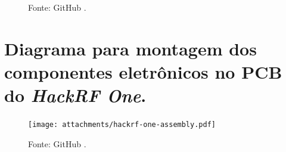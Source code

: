 \documentclass[
  12pt,				%
  openright,			%
  twoside,			%
  a4paper,			%
  english,			%
  french,				%
  spanish,			%
  brazil,				%
  ]{abntex2}
\begin{document}
\begin{anexosenv}
\begin{figure}[!htb]
    Fonte: GitHub \cite{HACKRF-hardware}.
  \end{figure}

  \chapter{Diagrama para montagem dos componentes eletrônicos no PCB do \textit{HackRF One}.}
  \label{attachment:hackrf-one-assembly}
  \begin{figure}[!htb]
    \centering
    \texttt{[image: attachments/hackrf-one-assembly.pdf]}

    Fonte: GitHub \cite{HACKRF-hardware}.
  \end{figure}


\end{anexosenv}



\printindex




\end{document}
